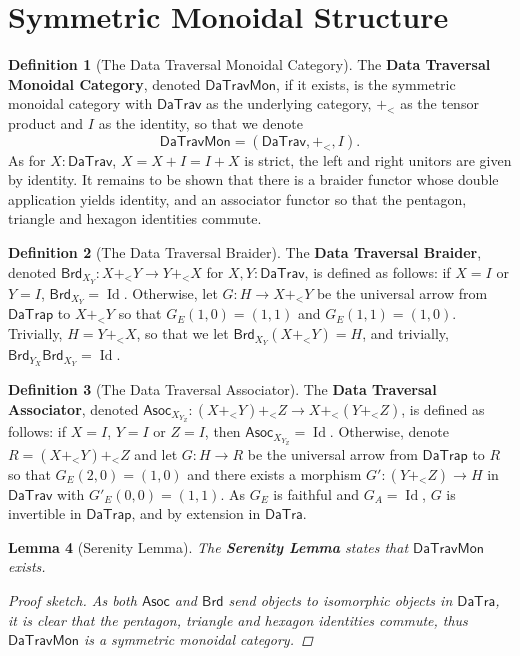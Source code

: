 \documentclass[11pt]{article}
\theoremstyle{definition}
\newtheorem{definition}{Definition}[section]
\theoremstyle{plain}
\newtheorem{lemma}[definition]{Lemma}
\newcommand{\id}{\operatorname{Id}}
\begin{document}
\section{Symmetric Monoidal Structure}

\begin{definition}[The Data Traversal Monoidal Category]
The \textbf{Data Traversal Monoidal Category}, denoted $\mathsf{DaTravMon}$,
if it exists, is the symmetric monoidal category with $\mathsf{DaTrav}$ as the
underlying category, $+_{<}$ as the tensor product and $I$ as the identity,
so that we denote
\[
  \mathsf{DaTravMon}=(\mathsf{DaTrav},+_{<},I).
\]
As for $X : \mathsf{DaTrav}$, $X=X+I=I+X$ is strict, the left and right
unitors are given by identity. It remains to be shown that there is a braider
functor whose double application yields identity, and an associator functor so
that the pentagon, triangle and hexagon identities commute.
\end{definition}

\begin{definition}[The Data Traversal Braider]
The \textbf{Data Traversal Braider}, denoted
$\mathsf{Brd}_{X_Y} : X+_{<}Y \to Y+_{<}X$ for
$X,Y : \mathsf{DaTrav}$, is defined as follows: if $X=I$ or $Y=I$,
$\mathsf{Brd}_{X_Y}=\id$. Otherwise, let $G : H \to X+_{<}Y$ be the
universal arrow from $\mathsf{DaTrap}$ to $X+_{<}Y$ so that
$G_E(1,0)=(1,1)$ and $G_E(1,1)=(1,0)$. Trivially, $H=Y+_{<}X$, so that we
let $\mathsf{Brd}_{X_Y}(X+_{<}Y)=H$, and trivially,
$\mathsf{Brd}_{Y_X}\mathsf{Brd}_{X_Y}=\id$.
\end{definition}

\begin{definition}[The Data Traversal Associator]
The \textbf{Data Traversal Associator}, denoted
$\mathsf{Asoc}_{X_{Y_Z}} : (X+_{<}Y)+_{<}Z \to X+_{<}(Y+_{<}Z)$, is
defined as follows: if $X=I$, $Y=I$ or $Z=I$, then
$\mathsf{Asoc}_{X_{Y_Z}}=\id$. Otherwise, denote
$R=(X+_{<}Y)+_{<}Z$ and let $G : H \to R$ be the universal arrow from
$\mathsf{DaTrap}$ to $R$ so that $G_E(2,0)=(1,0)$ and there exists a
morphism $G' : (Y+_{<}Z) \to H$ in $\mathsf{DaTrav}$ with
$G'_E(0,0)=(1,1)$. As $G_E$ is faithful and $G_A=\id$, $G$ is invertible in
$\mathsf{DaTrap}$, and by extension in $\mathsf{DaTra}$.
\end{definition}

\begin{lemma}[Serenity Lemma]
The \textbf{Serenity Lemma} states that $\mathsf{DaTravMon}$ exists.

\begin{proof}[Proof sketch]
As both $\mathsf{Asoc}$ and $\mathsf{Brd}$ send objects to isomorphic objects
in $\mathsf{DaTra}$, it is clear that the pentagon, triangle and hexagon
identities commute, thus $\mathsf{DaTravMon}$ is a symmetric monoidal
category.
\end{proof}
\end{lemma}
\end{document}
